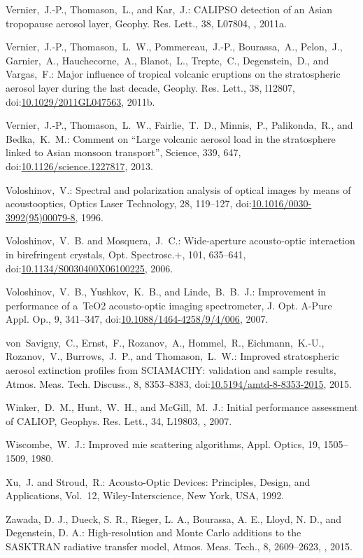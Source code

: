 \documentclass[amtd, online, hvmath]{copernicus}
\begin{document}
\begin{thebibliography}{99}
Vernier,~J.-P., Thomason,~L., and Kar,~J.: CALIPSO detection of an Asian
tropopause aerosol layer, Geophy. Res. Lett., 38, L07804,
, 2011a.


Vernier,~J.-P., Thomason,~L.~W., Pommereau,~J.-P., Bourassa,~A., Pelon,~J.,
Garnier,~A., Hauchecorne,~A., Blanot,~L., Trepte,~C., Degenstein,~D., and
Vargas,~F.: Major influence of tropical volcanic eruptions on the
stratospheric aerosol layer during the last decade, Geophy. Res. Lett., 38,
l12807,
doi:\href{http://dx.doi.org/10.1029/2011GL047563}{10.1029/2011GL047563},
2011b.


Vernier,~J.-P., Thomason,~L.~W., Fairlie,~T.~D., Minnis,~P., Palikonda,~R.,
and Bedka,~K.~M.: Comment on ``Large volcanic aerosol load in the
stratosphere linked to Asian monsoon transport'', Science, 339, 647,
doi:\href{http://dx.doi.org/10.1126/science.1227817}{10.1126/science.1227817},
2013.


Voloshinov,~V.: Spectral and polarization analysis of optical images by means
of acoustooptics, Optics Laser Technology, 28, 119--127,
doi:\href{http://dx.doi.org/10.1016/0030-3992(95)00079-8}{10.1016/0030-3992(95)00079-8},
1996.


Voloshinov,~V.~B. and Mosquera,~J.~C.: Wide-aperture acousto-optic
interaction in birefringent crystals, Opt. Spectrosc.$+$, 101, 635--641,
doi:\href{http://dx.doi.org/10.1134/S0030400X06100225}{10.1134/S0030400X06100225},
2006.


Voloshinov,~V.~B., Yushkov,~K.~B., and Linde,~B.~B.~J.: Improvement in
performance of a~TeO2 acousto-optic imaging spectrometer, J. Opt. A-Pure
Appl. Op., 9, 341--347,
doi:\href{http://dx.doi.org/10.1088/1464-4258/9/4/006}{10.1088/1464-4258/9/4/006},
2007.


von~Savigny,~C., Ernst,~F., Rozanov,~A., Hommel,~R., Eichmann,~K.-U.,
Rozanov,~V., Burrows,~J.~P., and Thomason,~L.~W.: Improved stratospheric
aerosol extinction profiles from SCIAMACHY: validation and sample results,
Atmos. Meas. Tech. Discuss., 8, 8353--8383,
doi:\href{http://dx.doi.org/10.5194/amtd-8-8353-2015}{10.5194/amtd-8-8353-2015},
2015.


Winker,~D.~M., Hunt,~W.~H., and McGill,~M.~J.: Initial performance assessment
of CALIOP, Geophys. Res. Lett., 34, L19803, , 2007.


Wiscombe,~W.~J.: Improved mie scattering algorithms, Appl. Optics, 19,
1505--1509, 1980.


Xu,~J. and Stroud,~R.: Acousto-Optic Devices: Principles, Design, and
Applications, Vol.~12, Wiley-Interscience, New York, USA, 1992.


Zawada, D. J., Dueck, S. R., Rieger, L. A., Bourassa, A. E., Lloyd, N. D.,
and Degenstein, D. A.: High-resolution and Monte Carlo additions to the
SASKTRAN radiative transfer model, Atmos. Meas. Tech., 8, 2609--2623,
, 2015.

\end{thebibliography}
\end{document}
